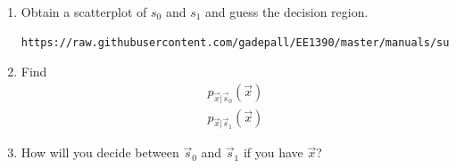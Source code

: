 \documentclass[journal,12pt,twocolumn]{IEEEtran}
\renewcommand\thesection{\arabic{section}}
\begin{document}
\begin{enumerate}[label=\thesection.\arabic*
,ref=\thesection.\theenumi]
%
where $\vec{s}\in \cbrak{\vec{s}_0,\vec{s}_1}$ and $\vec{n}\sim \mathcal{N}\brak{0,\sigma^2 \vec{I}}$, show 
that
\begin{align}
\mathbf{x}|0 = 
\begin{pmatrix*}
a + n_{1}\\
n_{2}
\end{pmatrix*},
\end{align}
and 
\begin{align}
\mathbf{x}|1 = 
\begin{pmatrix*}
n_{1}\\
a + n_{2}
\end{pmatrix*},
\end{align}
%
\item Obtain a scatterplot of $s_0$ and $s_1$ and guess the decision 
region.
\\
\solution
\begin{lstlisting}
https://raw.githubusercontent.com/gadepall/EE1390/master/manuals/supervised/linear_class/codes/bfsk_scatter.py
\end{lstlisting}

\item Find
\begin{align}
\label{eq:least_vecs}
p_{\vec{x}|\vec{s}_0}(\vec{x})
\\
p_{\vec{x}|\vec{s}_1}(\vec{x})
\end{align}
%
\item How will you decide between $\vec{s}_0$ and $\vec{s}_1$ if you have $\vec{x}$?
%
%
%
%
\end{enumerate}
\end{document}
